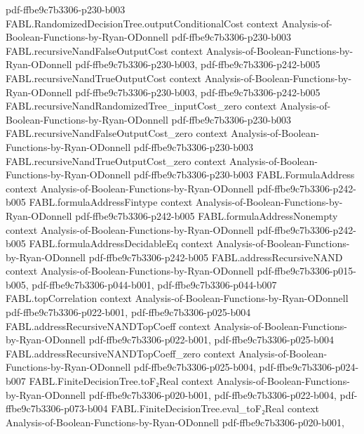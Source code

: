 \begin{theorem}
  {pdf-ffbe9c7b3306-p230-b003}
\proofstep
  {FABL.RandomizedDecisionTree.outputConditionalCost}
  {context}
  {Analysis-of-Boolean-Functions-by-Ryan-ODonnell}
  {pdf-ffbe9c7b3306-p230-b003}
\proofstep
  {FABL.recursiveNandFalseOutputCost}
  {context}
  {Analysis-of-Boolean-Functions-by-Ryan-ODonnell}
  {pdf-ffbe9c7b3306-p230-b003,
    pdf-ffbe9c7b3306-p242-b005}
\proofstep
  {FABL.recursiveNandTrueOutputCost}
  {context}
  {Analysis-of-Boolean-Functions-by-Ryan-ODonnell}
  {pdf-ffbe9c7b3306-p230-b003,
    pdf-ffbe9c7b3306-p242-b005}
\proofstep
  {FABL.recursiveNandRandomizedTree_inputCost_zero}
  {context}
  {Analysis-of-Boolean-Functions-by-Ryan-ODonnell}
  {pdf-ffbe9c7b3306-p230-b003}
\proofstep
  {FABL.recursiveNandFalseOutputCost_zero}
  {context}
  {Analysis-of-Boolean-Functions-by-Ryan-ODonnell}
  {pdf-ffbe9c7b3306-p230-b003}
\proofstep
  {FABL.recursiveNandTrueOutputCost_zero}
  {context}
  {Analysis-of-Boolean-Functions-by-Ryan-ODonnell}
  {pdf-ffbe9c7b3306-p230-b003}
\proofstep
  {FABL.FormulaAddress}
  {context}
  {Analysis-of-Boolean-Functions-by-Ryan-ODonnell}
  {pdf-ffbe9c7b3306-p242-b005}
\proofstep
  {FABL.formulaAddressFintype}
  {context}
  {Analysis-of-Boolean-Functions-by-Ryan-ODonnell}
  {pdf-ffbe9c7b3306-p242-b005}
\proofstep
  {FABL.formulaAddressNonempty}
  {context}
  {Analysis-of-Boolean-Functions-by-Ryan-ODonnell}
  {pdf-ffbe9c7b3306-p242-b005}
\proofstep
  {FABL.formulaAddressDecidableEq}
  {context}
  {Analysis-of-Boolean-Functions-by-Ryan-ODonnell}
  {pdf-ffbe9c7b3306-p242-b005}
\proofstep
  {FABL.addressRecursiveNAND}
  {context}
  {Analysis-of-Boolean-Functions-by-Ryan-ODonnell}
  {pdf-ffbe9c7b3306-p015-b005,
    pdf-ffbe9c7b3306-p044-b001,
    pdf-ffbe9c7b3306-p044-b007}
\proofstep
  {FABL.topCorrelation}
  {context}
  {Analysis-of-Boolean-Functions-by-Ryan-ODonnell}
  {pdf-ffbe9c7b3306-p022-b001,
    pdf-ffbe9c7b3306-p025-b004}
\proofstep
  {FABL.addressRecursiveNANDTopCoeff}
  {context}
  {Analysis-of-Boolean-Functions-by-Ryan-ODonnell}
  {pdf-ffbe9c7b3306-p022-b001,
    pdf-ffbe9c7b3306-p025-b004}
\proofstep
  {FABL.addressRecursiveNANDTopCoeff_zero}
  {context}
  {Analysis-of-Boolean-Functions-by-Ryan-ODonnell}
  {pdf-ffbe9c7b3306-p025-b004,
    pdf-ffbe9c7b3306-p024-b007}
\proofstep
  {FABL.FiniteDecisionTree.toF₂Real}
  {context}
  {Analysis-of-Boolean-Functions-by-Ryan-ODonnell}
  {pdf-ffbe9c7b3306-p020-b001,
    pdf-ffbe9c7b3306-p022-b004,
    pdf-ffbe9c7b3306-p073-b004}
\proofstep
  {FABL.FiniteDecisionTree.eval_toF₂Real}
  {context}
  {Analysis-of-Boolean-Functions-by-Ryan-ODonnell}
  {pdf-ffbe9c7b3306-p020-b001,
}
\end{theorem}
